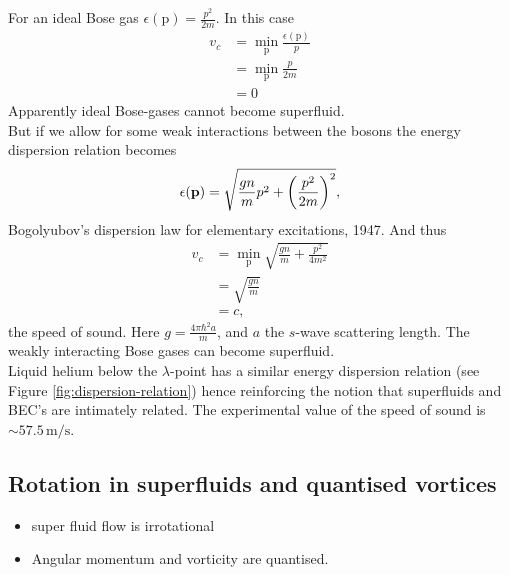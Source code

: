 \documentclass[11pt,a4paper,twoside]{article}
\renewcommand{\vec}[1]{\bm{\mathrm{#1}}}
\newcommand{\unit}[1]{\,\mathrm{#1}}
\begin{document}
			For an ideal Bose gas $\epsilon(\vec{p})= \frac{p^2}{2m}$. In this case 
			\begin{align}
				v_c &= \min_{\vec{p}}\frac{\epsilon(\vec{p})}{p} \\
					&= \min_{\vec{p}}\frac{p}{2m} \\
					&= 0
			\end{align}
			Apparently ideal Bose-gases cannot become superfluid.\\
			
			But if we allow for some weak interactions between the bosons the energy dispersion relation becomes
			\begin{align}
				\epsilon(\vec{p})=\sqrt{\frac{gn}{m}p^2+\qty(\frac{p^2}{2m})^2},
			\end{align}
			Bogolyubov's dispersion law for elementary excitations, 1947. And thus
			\begin{align}
				v_c &=\min_{\vec{p}}\sqrt{\frac{gn}{m}+\frac{p^2}{4m^2}} \\
					&= \sqrt{\frac{gn}{m}} \\
					&= c,
			\end{align}
			the speed of sound. Here $g=\frac{4\pi\hbar^2a}{m}$, and $a$ the $s$-wave scattering length. The weakly interacting Bose gases can become superfluid.\\			

			Liquid helium below the $\lambda$-point has a similar energy dispersion relation (see Figure \ref{fig:dispersion-relation}) hence reinforcing the notion that superfluids and BEC's are intimately related. The experimental value of the speed of sound is $\sim\!57.5\unit{m/s}$.
			
		\subsection{Rotation in superfluids and quantised vortices}
			\begin{itemize}
				\item super fluid flow is irrotational
				\item Angular momentum and vorticity are quantised.
			\end{itemize}
\end{document}
